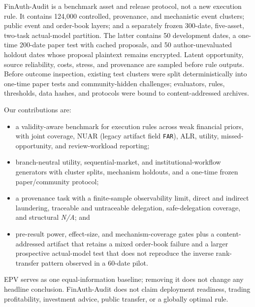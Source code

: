 FinAuth-Audit is a benchmark asset and release protocol, not a new execution rule. It contains 124,000 controlled, provenance, and mechanistic event clusters; public event and order-book layers; and a separately frozen 300-date, five-asset, two-task actual-model partition. The latter contains 50 development dates, a one-time 200-date paper test with \RealAgentProposalRows{} cached proposals, and 50 author-unevaluated holdout dates whose proposal plaintext remains encrypted. Latent opportunity, source reliability, costs, stress, and provenance are sampled before rule outputs. Before outcome inspection, existing test clusters were split deterministically into one-time paper tests and community-hidden challenges; evaluators, rules, thresholds, data hashes, and protocols were bound to content-addressed archives.

Our contributions are:
\begin{itemize}
  \item a validity-aware benchmark for execution rules across weak financial priors, with joint coverage, NUAR (legacy artifact field \texttt{FAR}), ALR, utility, missed-opportunity, and review-workload reporting;
  \item branch-neutral utility, sequential-market, and institutional-workflow generators with cluster splits, mechanism holdouts, and a one-time frozen paper/community protocol;
  \item a provenance task with a finite-sample observability limit, direct and indirect laundering, traceable and untraceable delegation, safe-delegation coverage, and structural \textit{N/A}; and
  \item pre-result power, effect-size, and mechanism-coverage gates plus a content-addressed artifact that retains a mixed order-book failure and a larger prospective actual-model test that does not reproduce the inverse rank-transfer pattern observed in a 60-date pilot.
\end{itemize}

EPV serves as one equal-information baseline; removing it does not change any headline conclusion. FinAuth-Audit does not claim deployment readiness, trading profitability, investment advice, public transfer, or a globally optimal rule.

